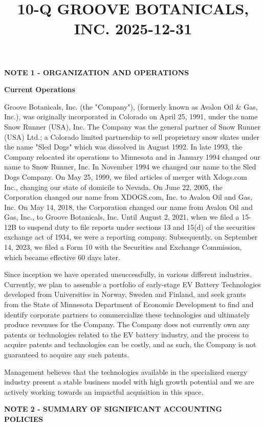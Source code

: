 \documentclass[11pt,a4paper]{article}
\title{10-Q GROOVE BOTANICALS, INC. 2025-12-31}
\begin{document}
\maketitle

\textbf{NOTE 1 - ORGANIZATION AND OPERATIONS}

\textbf{Current Operations}

Groove Botanicals, Inc. (the "Company"), (formerly known as Avalon Oil \& Gas, Inc.), was originally incorporated in Colorado on April 25, 1991, under the name Snow Runner (USA), Inc. The Company was the general partner of Snow Runner (USA) Ltd.; a Colorado limited partnership to sell proprietary snow skates under the name "Sled Dogs" which was dissolved in August 1992. In late 1993, the Company relocated its operations to Minnesota and in January 1994 changed our name to Snow Runner, Inc. In November 1994 we changed our name to the Sled Dogs Company. On May 25, 1999, we filed articles of merger with Xdogs.com Inc., changing our state of domicile to Nevada. On June 22, 2005, the Corporation changed our name from XDOGS.com, Inc. to Avalon Oil and Gas, Inc. On May 14, 2018, the Corporation changed our name from Avalon Oil and Gas, Inc., to Groove Botanicals, Inc. Until August 2, 2021, when we filed a 15-12B to suspend duty to file reports under sections 13 and 15(d) of the securities exchange act of 1934, we were a reporting company. Subsequently, on September 14, 2023, we filed a Form 10 with the Securities and Exchange Commission, which became effective 60 days later.

Since inception we have operated unsuccessfully, in various different industries. Currently, we plan to assemble a portfolio of early-stage EV Battery Technologies developed from Universities in Norway, Sweden and Finland, and seek grants from the State of Minnesota Department of Economic Development to find and identify corporate partners to commercialize these technologies and ultimately produce revenues for the Company. The Company does not currently own any patents or technologies related to the EV battery industry, and the process to acquire patents and technologies can be costly, and as such, the Company is not guaranteed to acquire any such patents.

Management believes that the technologies available in the specialized energy industry present a stable business model with high growth potential and we are actively working towards an impactful acquisition in this space.

\textbf{NOTE 2 - SUMMARY OF SIGNIFICANT ACCOUNTING POLICIES}
\end{document}

